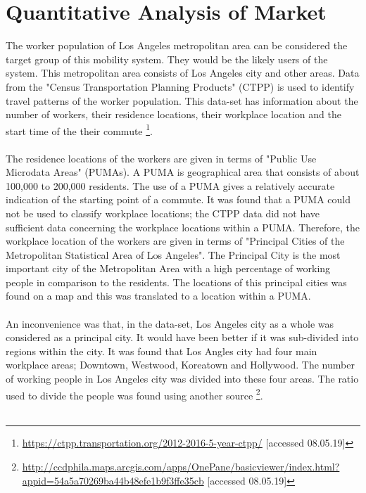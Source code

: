 \section{Quantitative Analysis of Market}
\label{quantmarket}
The worker population of Los Angeles metropolitan area can be considered the target group of this mobility system. They would be the likely users of the system. This metropolitan area consists of Los Angeles city and other areas.
Data from the "Census Transportation Planning Products" (CTPP) is used to identify travel patterns of the worker population. This data-set has information about the number of workers, their residence locations, their workplace location and the start time of the their commute \footnote{\url{https://ctpp.transportation.org/2012-2016-5-year-ctpp/} [accessed 08.05.19]}.\\\\
The residence locations of the workers are given in terms of "Public Use Microdata Areas" (PUMAs). A PUMA is geographical area that consists of about 100,000 to 200,000 residents. The use of a PUMA gives a relatively accurate indication of the starting point of a commute. It was found that a PUMA could not be used to classify workplace locations; the CTPP data did not have sufficient data concerning the workplace locations within a PUMA. Therefore, the workplace location of the workers are given in terms of "Principal Cities of the Metropolitan Statistical Area of Los Angeles". The Principal City is the most important city of the Metropolitan Area with a high percentage of working people in comparison to the residents. The locations of this principal cities was found on a map and this was translated to a location within a PUMA.\\\\
An inconvenience was that, in the data-set, Los Angeles city as a whole was considered as a principal city. It would have been better if it was sub-divided into regions within the city. It was found that Los Angles city had four main workplace areas; Downtown, Westwood, Koreatown and Hollywood. The number of working people in Los Angeles city was divided into these four areas. The ratio used to divide the people was found using another source \footnote{\url{http://ccdphila.maps.arcgis.com/apps/OnePane/basicviewer/index.html?appid=54a5a70269ba44b48efe1b9f3ffe35cb} [accessed 08.05.19]}. \\\\
